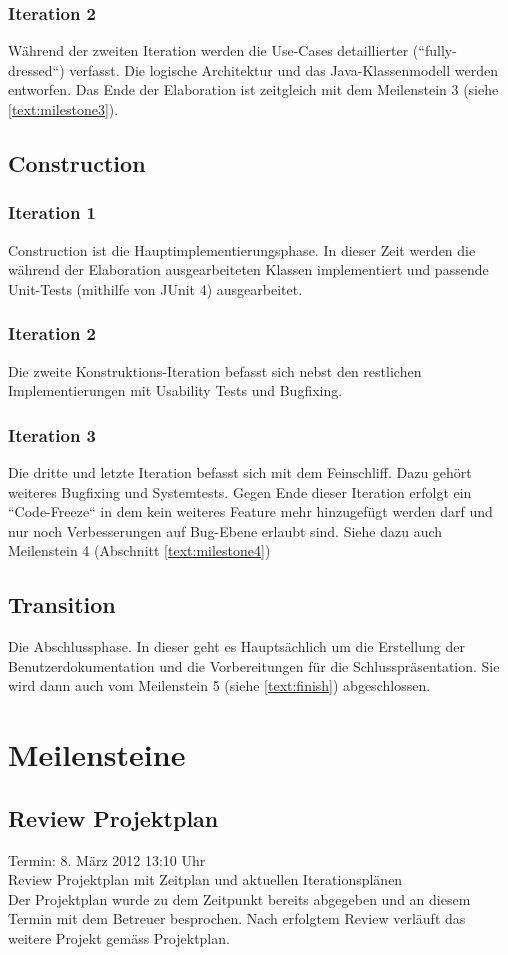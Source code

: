 \subsubsection{Iteration 2}
Während der zweiten Iteration werden die Use-Cases detaillierter (``fully-dressed``) verfasst. Die logische Architektur und das Java-Klassenmodell werden entworfen. Das Ende der Elaboration ist zeitgleich mit dem Meilenstein 3 (siehe \ref{text:milestone3}). 
\subsection{Construction}
\subsubsection{Iteration 1}
Construction ist die Hauptimplementierungsphase. In dieser Zeit werden die während der Elaboration ausgearbeiteten Klassen implementiert und passende Unit-Tests (mithilfe von JUnit 4) ausgearbeitet.
\subsubsection{Iteration 2}
Die zweite Konstruktions-Iteration befasst sich nebst den restlichen Implementierungen mit Usability Tests und Bugfixing.
\subsubsection{Iteration 3}
Die dritte und letzte Iteration befasst sich mit dem Feinschliff. Dazu gehört weiteres Bugfixing und Systemtests. Gegen Ende dieser Iteration erfolgt ein ``Code-Freeze`` in dem kein weiteres Feature mehr hinzugefügt werden darf und nur noch Verbesserungen auf Bug-Ebene erlaubt sind. Siehe dazu auch Meilenstein 4 (Abschnitt \ref{text:milestone4})
\subsection{Transition}
Die Abschlussphase. In dieser geht es Hauptsächlich um die Erstellung der Benutzerdokumentation und die Vorbereitungen für die Schlusspräsentation. Sie wird dann auch vom Meilenstein 5 (siehe \ref{text:finish}) abgeschlossen.
\section{Meilensteine}
\subsection{Review Projektplan}
\label{text:milestone1}
Termin: 8. März 2012 13:10 Uhr \\
Review Projektplan mit Zeitplan und aktuellen Iterationsplänen\\
Der Projektplan wurde zu dem Zeitpunkt bereits abgegeben und an diesem Termin mit dem Betreuer besprochen. Nach erfolgtem Review verläuft das weitere Projekt gemäss Projektplan.

